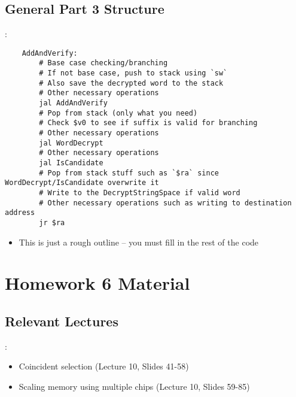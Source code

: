 \documentclass{../slides}
\begin{document}
\subsection{General Part 3 Structure}
\begin{frame}[fragile]{\secname: \subsecname}
    \begin{lstlisting}
    AddAndVerify:
        # Base case checking/branching
        # If not base case, push to stack using `sw`
        # Also save the decrypted word to the stack
        # Other necessary operations
        jal AddAndVerify
        # Pop from stack (only what you need)
        # Check $v0 to see if suffix is valid for branching
        # Other necessary operations
        jal WordDecrypt
        # Other necessary operations
        jal IsCandidate
        # Pop from stack stuff such as `$ra` since WordDecrypt/IsCandidate overwrite it
        # Write to the DecryptStringSpace if valid word
        # Other necessary operations such as writing to destination address
        jr $ra
    \end{lstlisting}
    \begin{itemize}
        \item This is just a rough outline -- you must fill in the rest of the code
    \end{itemize}
\end{frame}

\section{Homework 6 Material}
\subsection{Relevant Lectures}
\begin{frame}{\secname: \subsecname}
    \begin{itemize}
        \item Coincident selection (Lecture 10, Slides 41-58)
        \item Scaling memory using multiple chips (Lecture 10, Slides 59-85)
    \end{itemize}
\end{frame}
\end{document}
